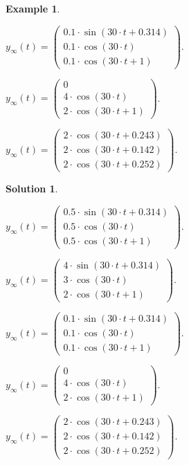 \documentclass[a4paper,12 pt]{article}
\numberwithin{equation}{section}
\theoremstyle{definition}
\newtheorem{bsp}{Example}
\theoremstyle{remark}
\theoremstyle{definition}
\newtheorem*{lsg}{Solution}
\theoremstyle{definition}
\theoremstyle{definition}
\theoremstyle{remark}
\newcommand{\cmark}{\ding{51}}%
\newcommand{\done}{\rlap{$\square$}{\raisebox{2pt}{\large\hspace{1pt}\cmark}}%
\hspace{-2.5pt}}
\begin{document}
\begin{bsp}
\begin{todolist}
  \item $y_\infty(t)=\begin{pmatrix} 
0.1\cdot \sin(30\cdot t+0.314)\\
0.1\cdot \cos(30\cdot t)\\
0.1\cdot \cos(30\cdot t +1)
\end{pmatrix}$.
  \item $y_\infty(t)=\begin{pmatrix} 
0\\
4\cdot \cos(30\cdot t)\\
2\cdot \cos(30\cdot t +1)
\end{pmatrix}$.
  \item $y_\infty(t)=\begin{pmatrix} 
2\cdot \cos(30\cdot t+0.243)\\
2\cdot \cos(30\cdot t+0.142)\\
2\cdot \cos(30\cdot t +0.252)
\end{pmatrix}$.
  \end{todolist}
  \newpage

\begin{lsg}
\
 \begin{todolist}
  \item  [\done]$y_\infty(t)=\begin{pmatrix} 
0.5\cdot \sin(30\cdot t+0.314)\\
0.5\cdot \cos(30\cdot t)\\
0.5\cdot \cos(30\cdot t +1)
\end{pmatrix}$.
  \item $y_\infty(t)=\begin{pmatrix} 
4\cdot \sin(30\cdot t+0.314)\\
3\cdot \cos(30\cdot t)\\
2\cdot \cos(30\cdot t +1)
\end{pmatrix}$.
  \item $y_\infty(t)=\begin{pmatrix} 
0.1\cdot \sin(30\cdot t+0.314)\\
0.1\cdot \cos(30\cdot t)\\
0.1\cdot \cos(30\cdot t +1)
\end{pmatrix}$.
  \item  [\done]$y_\infty(t)=\begin{pmatrix} 
0\\
4\cdot \cos(30\cdot t)\\
2\cdot \cos(30\cdot t +1)
\end{pmatrix}$.
  \item  [\done]$y_\infty(t)=\begin{pmatrix} 
2\cdot \cos(30\cdot t+0.243)\\
2\cdot \cos(30\cdot t+0.142)\\
2\cdot \cos(30\cdot t +0.252)
\end{pmatrix}$.
  \end{todolist}

\end{lsg}
\end{bsp}
\end{document}
